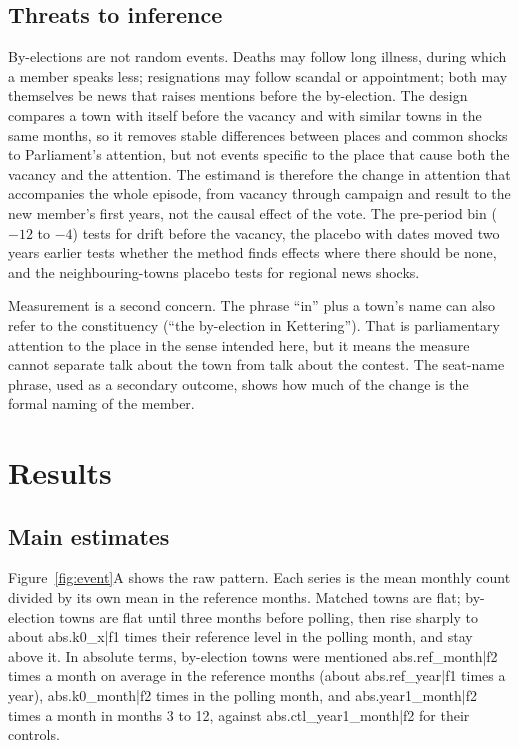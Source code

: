 \documentclass[11pt,a4paper]{article}
\begin{document}
\subsection{Threats to inference}
By-elections are not random events. Deaths may follow long illness, during which a member speaks less; resignations may follow scandal or appointment; both may themselves be news that raises mentions before the by-election. The design compares a town with itself before the vacancy and with similar towns in the same months, so it removes stable differences between places and common shocks to Parliament's attention, but not events specific to the place that cause both the vacancy and the attention. The estimand is therefore the change in attention that accompanies the whole episode, from vacancy through campaign and result to the new member's first years, not the causal effect of the vote. The pre-period bin ($-12$ to $-4$) tests for drift before the vacancy, the placebo with dates moved two years earlier tests whether the method finds effects where there should be none, and the neighbouring-towns placebo tests for regional news shocks.

Measurement is a second concern. The phrase ``in'' plus a town's name can also refer to the constituency (``the by-election in Kettering''). That is parliamentary attention to the place in the sense intended here, but it means the measure cannot separate talk about the town from talk about the contest. The seat-name phrase, used as a secondary outcome, shows how much of the change is the formal naming of the member.

\section{Results}\label{sec:results}
\subsection{Main estimates}
Figure~\ref{fig:event}A shows the raw pattern. Each series is the mean monthly count divided by its own mean in the reference months. Matched towns are flat; by-election towns are flat until three months before polling, then rise sharply to about {{abs.k0_x|f1}} times their reference level in the polling month, and stay above it. In absolute terms, by-election towns were mentioned {{abs.ref_month|f2}} times a month on average in the reference months (about {{abs.ref_year|f1}} times a year), {{abs.k0_month|f2}} times in the polling month, and {{abs.year1_month|f2}} times a month in months 3 to 12, against {{abs.ctl_year1_month|f2}} for their controls.
\end{document}
